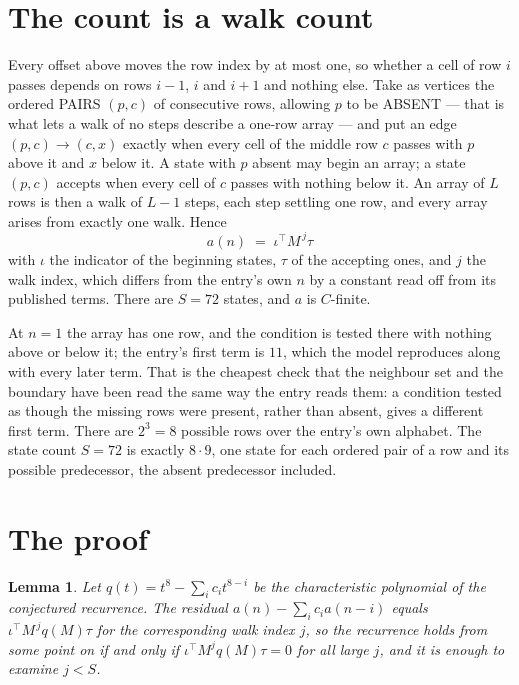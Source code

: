 \documentclass[11pt,a4paper]{article}
\theoremstyle{plain}
\newtheorem{lemma}[theorem]{Lemma}
\theoremstyle{definition}
\begin{document}
\section{The count is a walk count}

Every offset above moves the row index by at most one, so whether a cell of row $i$ passes
depends on rows $i-1$, $i$ and $i+1$ and nothing else. Take as vertices the ordered PAIRS
$(p,c)$ of consecutive rows, allowing $p$ to be ABSENT --- that is what lets a walk of no steps
describe a one-row array --- and put an edge $(p,c)\to(c,x)$ exactly when every cell of the
middle row $c$ passes with $p$ above it and $x$ below it. A state with $p$ absent may begin an
array; a state $(p,c)$ accepts when every cell of $c$ passes with nothing below it. An array of
$L$ rows is then a walk of $L-1$ steps, each step settling one row, and every array arises from
exactly one walk. Hence
\[
a(n)\;=\;\iota^{\!\top}M^{\,j}\tau
\]
with $\iota$ the indicator of the beginning states, $\tau$ of the accepting ones, and $j$ the
walk index, which differs from the entry's own $n$ by a constant read off from its published
terms. There are $S=72$ states, and $a$ is $C$-finite.

At $n=1$ the array has one row, and
the condition is tested there with nothing above or below it; the entry's first term is
$11$, which the model reproduces along with every later term. That is the cheapest check
that the neighbour set and the boundary have been read the same way the entry reads them: a
condition tested as though the missing rows were present, rather than absent, gives a different
first term. There are $2^{3}=8$ possible rows over the entry's own alphabet. The state count $S=72$ is exactly $8\cdot9$,
one state for each ordered pair of a row and its possible predecessor, the absent predecessor
included.

\section{The proof}

\begin{lemma}\label{lem:crit}
Let $q(t)=t^{8}-\sum_i c_it^{8-i}$ be the characteristic polynomial of the
conjectured recurrence. The residual $a(n)-\sum_ic_ia(n-i)$ equals
$\iota^{\!\top}M^{\,j}q(M)\tau$ for the corresponding walk index $j$, so the recurrence
holds from some point on if and only if $\iota^{\!\top}M^{j}q(M)\tau=0$ for all large $j$,
and it is enough to examine $j<S$.
\end{lemma}
\end{document}
